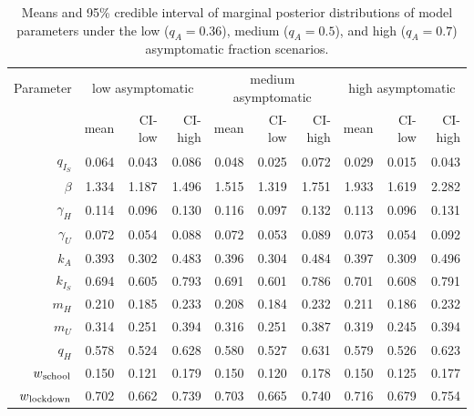 \documentclass[11pt]{article}
\begin{document}
\begin{table}[!htb]
	\centering
	\caption{Means and 95\% credible interval of marginal posterior distributions of model parameters under the low ($q_A = 0.36$), medium ($q_A = 0.5$), and high ($q_A = 0.7$) asymptomatic fraction scenarios.}
	\begin{tabular}{rrrrrrrrrr}
		\\\hline
		Parameter & \multicolumn{3}{c}{low asymptomatic} & \multicolumn{3}{c}{medium asymptomatic} & \multicolumn{3}{c}{high asymptomatic} \\
		{} & mean & CI-low & CI-high & mean & CI-low & CI-high & mean & CI-low & CI-high \\ 
		\hline
		$q_{I_S}$ & 0.064 & 0.043 & 0.086 & 0.048 & 0.025 & 0.072 & 0.029 & 0.015 & 0.043 \\ 
		$\beta$ & 1.334 & 1.187 & 1.496 & 1.515 & 1.319 & 1.751 & 1.933 & 1.619 & 2.282 \\ 
		$\gamma_H$ & 0.114 & 0.096 & 0.130 & 0.116 & 0.097 & 0.132 & 0.113 & 0.096 & 0.131 \\ 
		$\gamma_U$ & 0.072 & 0.054 & 0.088 & 0.072 & 0.053 & 0.089 & 0.073 & 0.054 & 0.092 \\ 
		$k_A$ & 0.393 & 0.302 & 0.483 & 0.396 & 0.304 & 0.484 & 0.397 & 0.309 & 0.496 \\ 
		$k_{I_S}$ & 0.694 & 0.605 & 0.793 & 0.691 & 0.601 & 0.786 & 0.701 & 0.608 & 0.791 \\ 
		$m_H$ & 0.210 & 0.185 & 0.233 & 0.208 & 0.184 & 0.232 & 0.211 & 0.186 & 0.232 \\ 
		$m_U$ & 0.314 & 0.251 & 0.394 & 0.316 & 0.251 & 0.387 & 0.319 & 0.245 & 0.394 \\ 
		$q_H$ & 0.578 & 0.524 & 0.628 & 0.580 & 0.527 & 0.631 & 0.579 & 0.526 & 0.623 \\ 
		$w\textsubscript{school}$ & 0.150 & 0.121 & 0.179 & 0.150 & 0.120 & 0.178 & 0.150 & 0.125 & 0.177 \\ 
		$w\textsubscript{lockdown}$ & 0.702 & 0.662 & 0.739 & 0.703 & 0.665 & 0.740 & 0.716 & 0.679 & 0.754 \\ 		
		\hline
	\end{tabular}
	\label{tbl:posterior}
\end{table}


\end{document}
